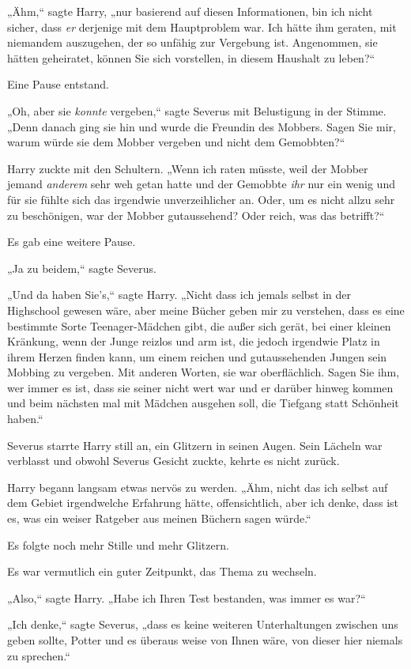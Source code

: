{„Ähm,“ sagte Harry, „nur basierend auf diesen Informationen, bin ich nicht sicher, dass \emph{er} derjenige mit dem Hauptproblem war. Ich hätte ihm geraten, mit niemandem auszugehen, der so unfähig zur Vergebung ist. Angenommen, sie hätten geheiratet, können Sie sich vorstellen, in diesem Haushalt zu leben?“

Eine Pause entstand.

„Oh, aber sie \emph{konnte} vergeben,“ sagte Severus mit Belustigung in der Stimme. „Denn danach ging sie hin und wurde die Freundin des Mobbers. Sagen Sie mir, warum würde sie dem Mobber vergeben und nicht dem Gemobbten?“

Harry zuckte mit den Schultern. „Wenn ich raten müsste, weil der Mobber jemand \emph{anderem} sehr weh getan hatte und der Gemobbte \emph{ihr} nur ein wenig und für sie fühlte sich das irgendwie unverzeihlicher an. Oder, um es nicht allzu sehr zu beschönigen, war der Mobber gutaussehend? Oder reich, was das betrifft?“

Es gab eine weitere Pause.

„Ja zu beidem,“ sagte Severus.

„Und da haben Sie's,“ sagte Harry. „Nicht dass ich jemals selbst in der Highschool gewesen wäre, aber meine Bücher geben mir zu verstehen, dass es eine bestimmte Sorte Teenager-Mädchen gibt, die außer sich gerät, bei einer kleinen Kränkung, wenn der Junge reizlos und arm ist, die jedoch irgendwie Platz in ihrem Herzen finden kann, um einem reichen und gutaussehenden Jungen sein Mobbing zu vergeben. Mit anderen Worten, sie war oberflächlich. Sagen Sie ihm, wer immer es ist, dass sie seiner nicht wert war und er darüber hinweg kommen und beim nächsten mal mit Mädchen ausgehen soll, die Tiefgang statt Schönheit haben.“

Severus starrte Harry still an, ein Glitzern in seinen Augen. Sein Lächeln war verblasst und obwohl Severus Gesicht zuckte, kehrte es nicht zurück.

Harry begann langsam etwas nervös zu werden. „Ähm, nicht das ich selbst auf dem Gebiet irgendwelche Erfahrung hätte, offensichtlich, aber ich denke, dass ist es, was ein weiser Ratgeber aus meinen Büchern sagen würde.“

Es folgte noch mehr Stille und mehr Glitzern.

Es war vermutlich ein guter Zeitpunkt, das Thema zu wechseln.

„Also,“ sagte Harry. „Habe ich Ihren Test bestanden, was immer es war?“

„Ich denke,“ sagte Severus, „dass es keine weiteren Unterhaltungen zwischen uns geben sollte, Potter und es überaus weise von Ihnen wäre, von dieser hier niemals zu sprechen.“

}
